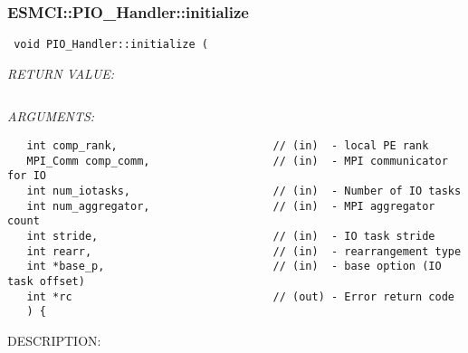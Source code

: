  
\setlength{\oldparskip}{\parskip}
\setlength{\parskip}{1.5ex}
\setlength{\oldparindent}{\parindent}
\setlength{\parindent}{0pt}
\setlength{\oldbaselineskip}{\baselineskip}
\setlength{\baselineskip}{11pt}
 
\def\bv{\begin{verbatim}}
\def\ev{\end{verbatim}}
\def\be{\begin{equation}}
\def\ee{\end{equation}}
\def\bea{\begin{eqnarray}}
\def\eea{\end{eqnarray}}
\def\bi{\begin{itemize}}
\def\ei{\end{itemize}}
\def\bn{\begin{enumerate}}
\def\en{\end{enumerate}}
\def\bd{\begin{description}}
\def\ed{\end{description}}
\def\({\left (}
\def\){\right )}
\def\[{\left [}
\def\]{\right ]}
\def\<{\left  \langle}
\def\>{\right \rangle}
\def\cI{{\cal I}}
\def\diag{\mathop{\rm diag}}
\def\tr{\mathop{\rm tr}}


 
\subsubsection [ESMCI::PIO\_Handler::initialize] {ESMCI::PIO\_Handler::initialize}


  
\begin{verbatim} void PIO_Handler::initialize (\end{verbatim}{\em RETURN VALUE:}
\begin{verbatim}      \end{verbatim}{\em ARGUMENTS:}
\begin{verbatim}   int comp_rank,                        // (in)  - local PE rank
   MPI_Comm comp_comm,                   // (in)  - MPI communicator for IO
   int num_iotasks,                      // (in)  - Number of IO tasks
   int num_aggregator,                   // (in)  - MPI aggregator count
   int stride,                           // (in)  - IO task stride
   int rearr,                            // (in)  - rearrangement type
   int *base_p,                          // (in)  - base option (IO task offset)
   int *rc                               // (out) - Error return code
   ) {\end{verbatim}
{\sf DESCRIPTION:\\ }


